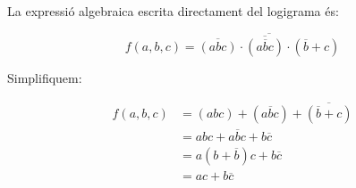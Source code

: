 \documentclass[catalan,varwidth=30em,border=15pt,crop=false,preview=true]{standalone}
\begin{document}
La expressió algebraica escrita directament del logigrama és:

\begin{equation*}
  f(a,b,c) = \overline{
    \overline{\left( a b c \right)} \cdot
    \overline{\left( a \overline{b} c \right)} \cdot
    \left( \overline{b} + c \right)
  }
\end{equation*}

Simplifiquem:

\begin{minipage}{\linewidth}
\begin{align*}
  f(a,b,c) &=
    \left( a b c \right) +
    \left( a \overline{b} c \right) +
    \overline{\left( \overline{b} + c \right)}
\\
  &=
    a b c +
    a \overline{b} c +
    b \overline{c}
\\
  &=
    a \left( b + \overline{b} \right) c +
    b \overline{c}
\\
  &=
    a c +
    b \overline{c}
\end{align*}
\end{minipage}
\end{document}
